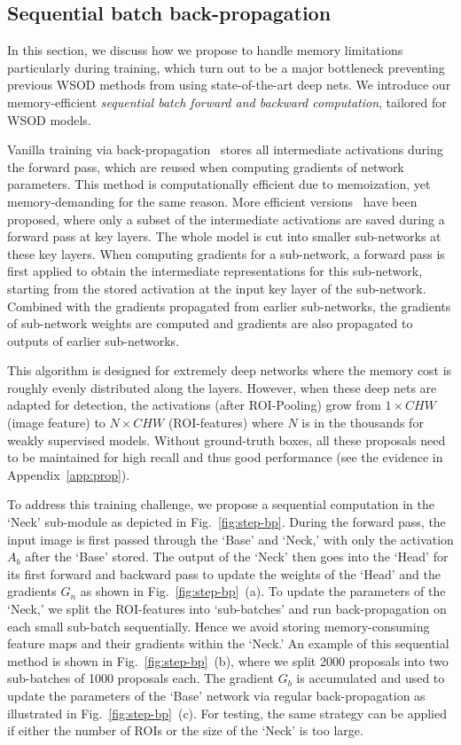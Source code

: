 \documentclass[10pt,twocolumn,letterpaper]{article}
\begin{document}
\subsection{Sequential batch back-propagation}
\label{sec:step-bp}
In this section, we discuss how we propose to handle memory limitations particularly during training, which turn out to be a major bottleneck preventing previous WSOD methods from using state-of-the-art deep nets. We introduce our  memory-efficient \emph{sequential batch forward and backward computation}, tailored for WSOD models. 

Vanilla training via back-propagation~\cite{Rumelhart}  stores all intermediate activations during the forward pass, which are  reused when computing gradients of network parameters. This method is computationally efficient due to memoization, yet memory-demanding for the same reason. More efficient versions~\cite{Kokkinos17,ChenXZG16} have been proposed, where only a subset of the intermediate activations are saved during a forward pass at key layers. The whole model is cut into smaller sub-networks at these key layers. When computing gradients for a sub-network, a forward pass is first applied  to obtain the intermediate representations for this sub-network, starting from the stored activation at the input key layer of the sub-network. Combined with the gradients propagated from earlier sub-networks, the gradients of sub-network weights are computed and gradients are also propagated to outputs of earlier sub-networks.

This algorithm is designed for extremely deep networks where the memory cost is roughly evenly distributed along the layers. However, when these deep nets are adapted for detection, the activations (after ROI-Pooling) grow from $1\times CHW$ (image feature) to $N\times CHW$ (ROI-features) where $N$ is in the thousands for weakly supervised models. Without ground-truth boxes, all these proposals  need to be maintained for high recall and thus good performance (see the evidence in Appendix~\ref{app:prop}).

To address this training challenge, we propose a sequential computation in the `Neck' sub-module as depicted in Fig.~\ref{fig:step-bp}. During the forward pass, the input image is first passed through the `Base' and `Neck,' with only the activation $A_b$ after the `Base' stored. The output of the `Neck' then goes into the `Head' for its first forward and backward pass to update the weights of the `Head' and the gradients $G_n$  as shown in Fig.~\ref{fig:step-bp}~(a). To update the parameters of the `Neck,' we split the ROI-features into `sub-batches' and run back-propagation on each small sub-batch sequentially. Hence we avoid storing memory-consuming feature maps and their gradients within the `Neck.' An example of this sequential method is shown in Fig.~\ref{fig:step-bp}~(b), where we split 2000 proposals into two sub-batches of 1000 proposals each. The gradient $G_b$ is accumulated and used to  update the parameters of the `Base' network via regular back-propagation as illustrated in Fig.~\ref{fig:step-bp}~(c).  For testing, the same strategy can be applied if either the number of ROIs or the size of the `Neck' is too large.
\end{document}
